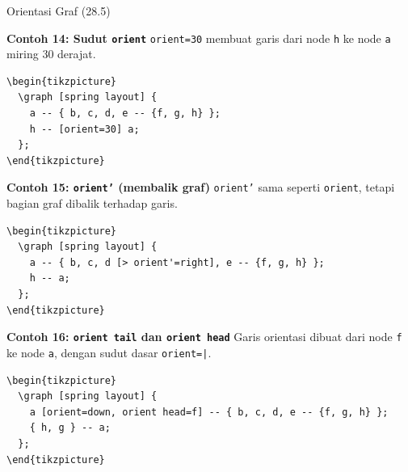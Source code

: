 \documentclass[aspectratio=169]{beamer}
\begin{document}
\begin{frame}{Orientasi Graf (28.5)}


\textbf{Contoh 14: Sudut \texttt{orient}}
\texttt{orient=30} membuat garis dari node \texttt{h} ke node \texttt{a} miring 30 derajat.
\begin{lstlisting}
\begin{tikzpicture}
  \graph [spring layout] {
    a -- { b, c, d, e -- {f, g, h} };
    h -- [orient=30] a;
  };
\end{tikzpicture}
\end{lstlisting}
\begin{center}\end{center}


\textbf{Contoh 15: \texttt{orient'} (membalik graf)}
\texttt{orient'} sama seperti \texttt{orient}, tetapi bagian graf dibalik terhadap garis.
\begin{lstlisting}
\begin{tikzpicture}
  \graph [spring layout] {
    a -- { b, c, d [> orient'=right], e -- {f, g, h} };
    h -- a;
  };
\end{tikzpicture}
\end{lstlisting}
\begin{center}\end{center}


\textbf{Contoh 16: \texttt{orient tail} dan \texttt{orient head}}
Garis orientasi dibuat dari node \texttt{f} ke node \texttt{a}, dengan sudut dasar \texttt{orient=|}.
\begin{lstlisting}
\begin{tikzpicture}
  \graph [spring layout] {
    a [orient=down, orient head=f] -- { b, c, d, e -- {f, g, h} };
    { h, g } -- a;
  };
\end{tikzpicture}
\end{lstlisting}
\begin{center}\end{center}



\end{frame}
\end{document}

